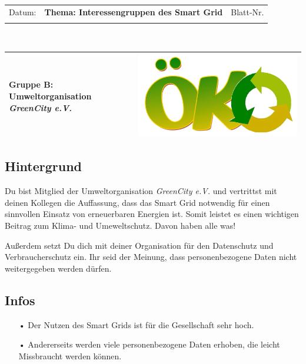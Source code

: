 \documentclass[11pt,a4paper,DIV=10,parskip=half,BCOR=0mm]{scrartcl}
\begin{document}
%
\setlength{\tabcolsep}{3mm} %
\noindent
\begin{tabularx}{\textwidth}{|l|T|l|}
\hline
Datum: & \rule{0pt}{5mm} \textbf{\textsf{Thema: Interessengruppen des Smart Grid}} & Blatt-Nr. \\
&&\\ 
\hline
\end{tabularx}
\rule{0pt}{3mm} \\
\setlength{\tabcolsep}{0mm} %
\begin{tabularx}{\linewidth}{lXr}
{\Large\textsf{\textbf{Gruppe B:} Umweltorganisation \textit{GreenCity e.V.}}} & & \includegraphics[scale=0.04]{images/oeko}\\
\hline
\end{tabularx}
%
\subsection*{Hintergrund}
Du bist Mitglied der Umweltorganisation \textit{GreenCity e.V.} und vertrittst
mit deinen Kollegen die Auffassung, dass das Smart Grid notwendig für einen sinnvollen Einsatz von erneuerbaren Energien ist. Somit leistet es einen wichtigen Beitrag zum Klima- und Umeweltschutz. Davon haben alle was!

Außerdem setzt Du dich mit deiner Organisation für den Datenschutz und
Verbraucherschutz ein. Ihr seid der Meinung, dass personenbezogene Daten nicht weitergegeben werden dürfen.
\subsection*{Infos}
\begin{enumerate}
	\item[•]Der Nutzen des Smart Grids ist für die Gesellschaft sehr hoch.
	\item[•]Andererseits werden viele personenbezogene Daten erhoben, die leicht Missbraucht werden können. 
\end{enumerate}
\end{document}
